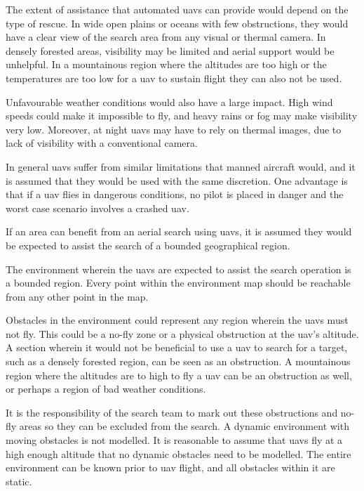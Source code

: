 The extent of assistance that automated \acp{uav} can provide would depend on the type of rescue. In wide open plains or oceans with few obstructions, they would have a clear view of the search area from any visual or thermal camera. In densely forested areas, visibility may be limited and aerial support would be unhelpful. In a mountainous region where the altitudes are too high or the temperatures are too low for a \ac{uav} to sustain flight they can also not be used. 

Unfavourable weather conditions would also have a large impact. High wind speeds could make it impossible to fly, and heavy rains or fog may make visibility very low. Moreover, at night \acp{uav} may have to rely on thermal images, due to lack of visibility with a conventional camera.

In general \acp{uav} suffer from similar limitations that manned aircraft would, and it is assumed that they would be used with the same discretion. One advantage is that if a \ac{uav} flies in dangerous conditions, no pilot is placed in danger and the worst case scenario involves a crashed \ac{uav}.

If an area can benefit from an aerial search using \acp{uav}, it is assumed they would be expected to assist the search of a bounded geographical region. %

The environment wherein the \acp{uav} are expected to assist the search operation is a bounded region. Every point within the environment map should be reachable from any other point in the map.

Obstacles in the environment could represent any region wherein the \acp{uav} must not fly. This could be a no-fly zone or a physical obstruction at the \ac{uav}'s altitude. A section wherein it would not be beneficial to use a \ac{uav} to search for a target, such as a densely forested region, can be seen as an obstruction. A mountainous region where the altitudes are to high to fly a \ac{uav} can be an obstruction as well, or perhaps a region of bad weather conditions. 

It is the responsibility of the search team to mark out these obstructions and no-fly areas so they can be excluded from the search. A dynamic environment with moving obstacles is not modelled. It is reasonable to assume that \acp{uav} fly at a high enough altitude that no dynamic obstacles need to be modelled. The entire environment can be known prior to \ac{uav} flight, and all obstacles within it are static.
